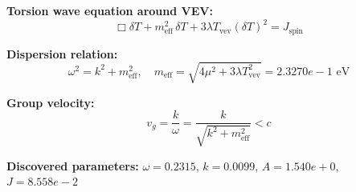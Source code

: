 
\textbf{Torsion wave equation around VEV:}
\begin{equation}
  \Box \delta T + m_{\text{eff}}^2 \, \delta T + 3\lambda T_{\text{vev}} (\delta T)^2 = J_{\text{spin}}
\end{equation}

\textbf{Dispersion relation:}
\begin{equation}
  \omega^2 = k^2 + m_{\text{eff}}^2, \quad
  m_{\text{eff}} = \sqrt{4\mu^2 + 3\lambda T_{\text{vev}}^2} = 2.3270e-1 \text{ eV}
\end{equation}

\textbf{Group velocity:}
\begin{equation}
  v_g = \frac{k}{\omega} = \frac{k}{\sqrt{k^2 + m_{\text{eff}}^2}} < c
\end{equation}

\textbf{Discovered parameters:}
$\omega = 0.2315$, \quad
$k = 0.0099$, \quad
$A = 1.540e+0$, \quad
$J = 8.558e-2$